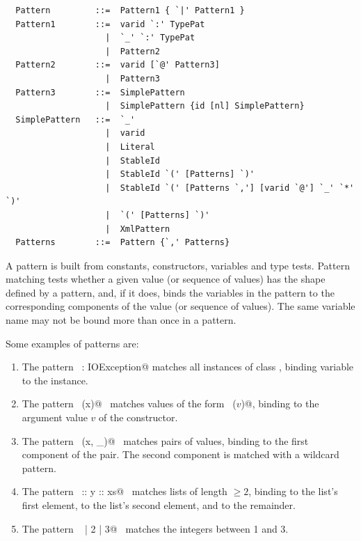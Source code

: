 \syntax\begin{lstlisting}
  Pattern         ::=  Pattern1 { `|' Pattern1 }
  Pattern1        ::=  varid `:' TypePat
                    |  `_' `:' TypePat
                    |  Pattern2
  Pattern2        ::=  varid [`@' Pattern3]
                    |  Pattern3
  Pattern3        ::=  SimplePattern 
                    |  SimplePattern {id [nl] SimplePattern}
  SimplePattern   ::=  `_'
                    |  varid
                    |  Literal
                    |  StableId
                    |  StableId `(' [Patterns] `)'
                    |  StableId `(' [Patterns `,'] [varid `@'] `_' `*' `)'
                    |  `(' [Patterns] `)'
                    |  XmlPattern
  Patterns        ::=  Pattern {`,' Patterns}
\end{lstlisting}


A pattern is built from constants, constructors, variables and type
tests. Pattern matching tests whether a given value (or sequence of values)
has the shape defined by a pattern, and, if it does, binds the
variables in the pattern to the corresponding components of the value
(or sequence of values).  The same variable name may not be bound more
than once in a pattern.

\example Some examples of patterns are:
\begin{enumerate}
\item
The pattern ~\lstinline@ex: IOException@ matches all instances of class
\lstinline@IOException@, binding variable \verb@ex@ to the instance.
\item
The pattern ~\lstinline@Some(x)@~ matches values of the form ~\lstinline@Some($v$)@,
binding \lstinline@x@ to the argument value $v$ of the  constructor.
\item
The pattern ~\lstinline@(x, _)@~ matches pairs of values, binding \lstinline@x@ to
the first component of the pair. The second component is matched
with a wildcard pattern.
\item
The pattern ~\lstinline@x :: y :: xs@~ matches lists of length $\geq 2$,
binding \lstinline@x@ to the list's first element, \lstinline@y@ to the list's
second element, and \lstinline@xs@ to the remainder.
\item
The pattern ~ | 2 | 3@~ matches the integers between 1 and 3.
\end{enumerate}

